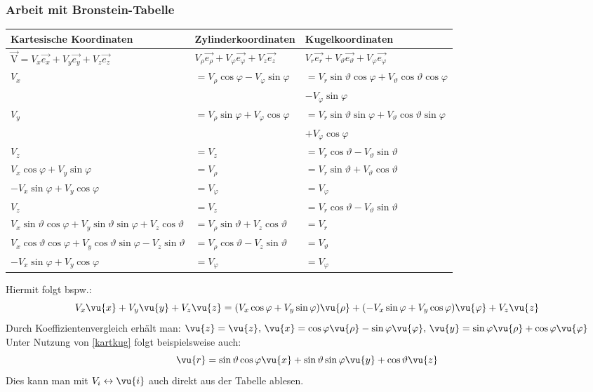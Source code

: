 \subsubsection{Arbeit mit Bronstein-Tabelle}
\begin{tabular}{|l|l|l|}
	\hline Kartesische Koordinaten & Zylinderkoordinaten & Kugelkoordinaten \\
	\hline $\vec{\mathrm{V}}=V_{x} \vec{{e}_{x}}+V_{y} \vec{{e}_{y}}+V_{z} \vec{{e}_{z}}$ & $V_{\rho} \vec{{e}_{\rho}}+V_{\varphi} \vec{{e}_{\varphi}}+V_{z} \vec{{e}_{z}}$ & $V_{r} \vec{{e}_{r}}+V_{\vartheta} \vec{{e}_{\vartheta}}+V_{\varphi} \vec{{e}_{\varphi}}$ \\
	\hline$V_{x}$ & $=V_{\rho} \cos \varphi-V_{\varphi} \sin \varphi$ & $=V_{r} \sin \vartheta \cos \varphi+V_{\vartheta} \cos \vartheta \cos \varphi$ \\
	& & $-V_{\varphi} \sin \varphi$\\
	$V_{y}$& $=V_{\rho} \sin \varphi+V_{\varphi} \cos \varphi$ & $=V_{r} \sin \vartheta \sin \varphi+V_{\vartheta} \cos \vartheta \sin \varphi$ \\
	& & $+V_{\varphi} \cos \varphi$ \\
		$V_{z}$ & $=V_{z}$ & $=V_{r} \cos \vartheta-V_{\vartheta} \sin \vartheta$ \\\hline
 $V_{x} \cos \varphi+V_{y} \sin \varphi$ & $=V_{\rho}$ & $=V_{r} \sin \vartheta+V_{\vartheta} \cos \vartheta$ \\
$-V_{x} \sin \varphi+V_{y} \cos \varphi$	& $=V_{\varphi}$ & $=V_{\varphi}$ \\
	 	$V_{z}$ & $=V_{z}$ & $=V_{r} \cos \vartheta-V_{\vartheta} \sin \vartheta$ \\\hline
	$V_{x} \sin \vartheta \cos \varphi+V_{y} \sin \vartheta \sin \varphi+V_{z} \cos \vartheta$	& $=V_{\rho} \sin \vartheta+V_{z} \cos \vartheta$ & $=V_{r}$ \\
	$V_{x} \cos \vartheta \cos \varphi+V_{y} \cos \vartheta \sin \varphi-V_{z} \sin \vartheta$ & $=V_{\rho} \cos \vartheta-V_{z} \sin \vartheta$ & $=V_{\vartheta}$ \\
	$-V_{x} \sin \varphi+V_{y} \cos \varphi$ & $=V_{\varphi}$ &$=V_{\varphi}$  \\
	\hline
\end{tabular}
Hiermit folgt bspw.:
$$
V_x\vu{x} +V_y\vu{y}+V_z\vu{z}=(V_x\cos\varphi+V_y\sin\varphi)\vu{\rho}+(-V_x\sin\varphi+V_y\cos\varphi)\vu{\varphi}+V_z\vu{z}
$$
Durch Koeffizientenvergleich erhält man: $\vu{z}=\vu{z},\,\vu{x}=\cos\varphi\vu{\rho}-\sin\varphi\vu{\varphi},\,\vu{y}=\sin\varphi\vu{\rho}+\cos\varphi\vu{\varphi}$\\
Unter Nutzung von \ref{kartkug} folgt beispielsweise auch:
$$
\vu{r}=\sin\vartheta\cos\varphi \vu{x}+ \sin\vartheta\sin\varphi \vu{y}+ \cos\vartheta\vu{z}
$$
Dies kann man mit $V_i\leftrightarrow\vu{i}$ auch direkt aus der Tabelle ablesen.

